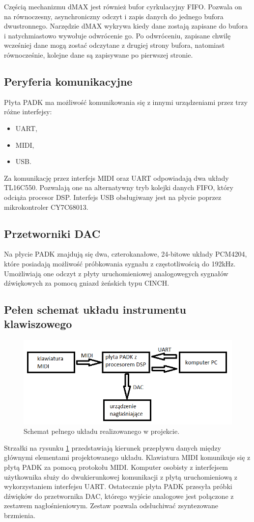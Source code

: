 Częścią mechanizmu dMAX jest również bufor cyrkulacyjny FIFO. Pozwala on na równoczesny, asynchroniczny odczyt i zapis danych do jednego bufora dwustronnego. Narzędzie dMAX wykrywa kiedy dane zostają zapisane do bufora i natychmiastowo wywołuje odwrócenie go. Po odwróceniu, zapisane chwilę wcześniej dane mogą zostać odczytane z drugiej strony bufora, natomiast równocześnie, kolejne dane są zapisywane po pierwszej stronie.

\subsection{Peryferia komunikacyjne}
Płyta PADK ma możliwość komunikowania się z innymi urządzeniami przez trzy różne interfejsy:
\begin{itemize}
	\item UART,
	\item MIDI,
	\item USB.
\end{itemize}
Za komunikację przez interfejs MIDI oraz UART odpowiadają dwa układy TL16C550. Pozwalają one na alternatywny tryb kolejki danych FIFO, który odciąża procesor DSP. Interfejs USB obsługiwany jest na płycie poprzez mikrokontroler CY7C68013.

\subsection{Przetworniki DAC}
Na płycie PADK znajdują się dwa, czterokanałowe, 24-bitowe układy PCM4204, które posiadają możliwość próbkowania sygnału z częstotliwością do 192kHz. Umożliwiają one odczyt z płyty uruchomieniowej analogowegych sygnałów dźwiękowych za pomocą gniazd żeńskich typu CINCH.

\subsection{Pełen schemat układu instrumentu klawiszowego}
\begin{figure}[H]
	\centering
	\includegraphics[width=12cm]{./grafiki/real_pelen_uklad}
	\captionsetup{justification=centering}
	\caption{Schemat pełnego układu realizowanego w projekcie.}
	\label{rys:real_uklad}
\end{figure}
Strzałki na rysunku \ref{rys:real_uklad} przedstawiają kierunek przepływu danych między głównymi elementami projektowanego układu. Klawiatura MIDI komunikuje się z płytą PADK za pomocą protokołu MIDI. Komputer osobisty z interfejsem użytkownika służy do dwukierunkowej komunikacji z płytą uruchomieniową z wykorzystaniem interfejsu UART. Ostatecznie płyta PADK przesyła próbki dźwięków do przetwornika DAC, którego wyjście analogowe jest połączone z zestawem nagłośnieniowym. Zestaw pozwala odsłuchiwać zsyntezowane brzmienia.

